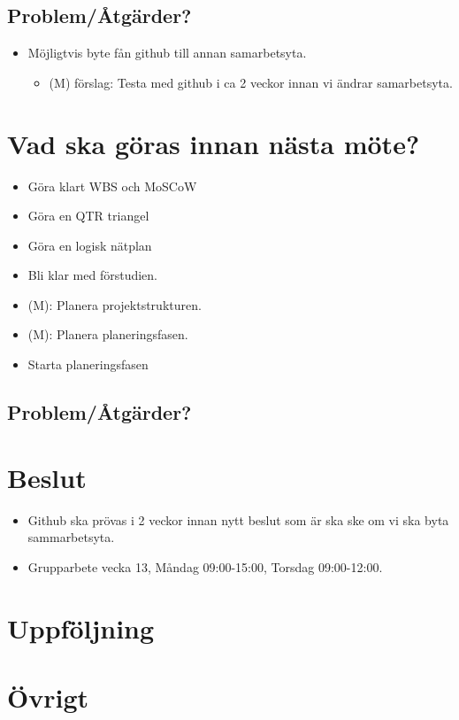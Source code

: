 \subsection*{Problem/Åtgärder?}
\begin{itemize}[noitemsep]
    \item Möjligtvis byte fån github till annan samarbetsyta.
    \begin{itemize}[noitemsep]
        \item (M) förslag: Testa med github i ca 2 veckor innan vi ändrar samarbetsyta.
    \end{itemize}
\end{itemize}

\section*{Vad ska göras innan nästa möte?}
\begin{itemize}[noitemsep]
	\item Göra klart WBS och MoSCoW
	\item Göra en QTR triangel
	\item Göra en logisk nätplan
    \item Bli klar med förstudien.
    \item (M): Planera projektstrukturen.
    \item (M): Planera planeringsfasen.
    \item Starta planeringsfasen

\end{itemize}

\subsection*{Problem/Åtgärder?}

\section*{Beslut}
\begin{itemize}
	\item Github ska prövas i 2 veckor innan nytt beslut som är ska ske om vi ska byta sammarbetsyta.
	\item Grupparbete vecka 13, Måndag 09:00-15:00, Torsdag 09:00-12:00.
\end{itemize}
\section*{Uppföljning}

\section*{Övrigt}